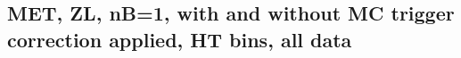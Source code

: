 \documentclass[11pt]{article}
\begin{document}















     \subsection{ MET, ZL, nB=1, with and without MC trigger correction applied, HT bins, all data}
\end{document}

